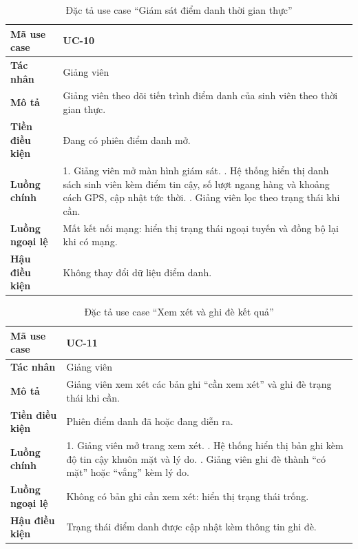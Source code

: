\begin{table}[H]
\centering
\small
\caption{Đặc tả use case ``Giám sát điểm danh thời gian thực''}
\label{tab:uc-monitor}
\begin{tabular}{|p{3cm}|p{10.6cm}|}
\hline
\textbf{Mã use case} & UC-10 \\ \hline
\textbf{Tác nhân} & Giảng viên \\ \hline
\textbf{Mô tả} & Giảng viên theo dõi tiến trình điểm danh của sinh viên theo thời gian thực. \\ \hline
\textbf{Tiền điều kiện} & Đang có phiên điểm danh mở. \\ \hline
\textbf{Luồng chính} & 1. Giảng viên mở màn hình giám sát. \newline 2. Hệ thống hiển thị danh sách sinh viên kèm điểm tin cậy, số lượt ngang hàng và khoảng cách GPS, cập nhật tức thời. \newline 3. Giảng viên lọc theo trạng thái khi cần. \\ \hline
\textbf{Luồng ngoại lệ} & Mất kết nối mạng: hiển thị trạng thái ngoại tuyến và đồng bộ lại khi có mạng. \\ \hline
\textbf{Hậu điều kiện} & Không thay đổi dữ liệu điểm danh. \\ \hline
\end{tabular}
\end{table}

\begin{table}[H]
\centering
\small
\caption{Đặc tả use case ``Xem xét và ghi đè kết quả''}
\label{tab:uc-review}
\begin{tabular}{|p{3cm}|p{10.6cm}|}
\hline
\textbf{Mã use case} & UC-11 \\ \hline
\textbf{Tác nhân} & Giảng viên \\ \hline
\textbf{Mô tả} & Giảng viên xem xét các bản ghi ``cần xem xét'' và ghi đè trạng thái khi cần. \\ \hline
\textbf{Tiền điều kiện} & Phiên điểm danh đã hoặc đang diễn ra. \\ \hline
\textbf{Luồng chính} & 1. Giảng viên mở trang xem xét. \newline 2. Hệ thống hiển thị bản ghi kèm độ tin cậy khuôn mặt và lý do. \newline 3. Giảng viên ghi đè thành ``có mặt'' hoặc ``vắng'' kèm lý do. \\ \hline
\textbf{Luồng ngoại lệ} & Không có bản ghi cần xem xét: hiển thị trạng thái trống. \\ \hline
\textbf{Hậu điều kiện} & Trạng thái điểm danh được cập nhật kèm thông tin ghi đè. \\ \hline
\end{tabular}
\end{table}

